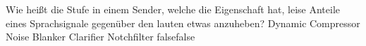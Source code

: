     {Wie heißt die Stufe in einem Sender, welche die Eigenschaft hat, leise Anteile eines Sprachsignale gegenüber den lauten etwas anzuheben?}
    {Dynamic Compressor}
    {Noise Blanker}
    {Clarifier}
    {Notchfilter}
    {false}{false}